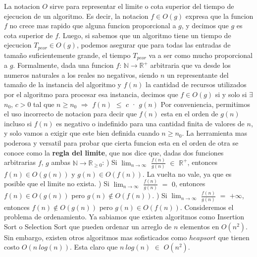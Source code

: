 \documentclass[10pt,a4paper]{article}
\begin{document}
La notacion $O$ sirve para representar el limite o cota superior del tiempo de ejecucion de un algoritmo. Es decir, la notacion $f \in O(g)$ expresa que la funcion $f$ no crece mas rapido que alguna funcion proporcional a $g$, y decimos que $g$ es cota superior de $f$. Luego, si sabemos que un algoritmo tiene un tiempo de ejecucion $T_{peor} \in O(g)$, podemos asegurar que para todas las entradas de tamaño suficientemente grande, el tiempo $T_{peor}$ va a ser como mucho proporcional a $g$. Formalmente, dada una funcion $f$: $\mathbb{N} \to \mathbb{R}^{+}$ arbitraria que va desde los numeros naturales a los reales no negativos, siendo $n$ un representante del tamaño de la instancia del algoritmo y $f(n)$ la cantidad de recursos utilizados por el algoritmo para procesar esa instancia, decimos que $f \in O(g)$ si y solo si $\exists$ $n_{0}$, $c > 0$ tal que $n \geq n_{0}$ $\Rightarrow$ $f(n)$ $\leq$ $c$ · $g(n)$
\newline
\newline
Por conveniencia, permitimos el uso incorrecto de notacion para decir que $f(n)$ esta en el orden de $g(n)$ incluso si $f(n)$ es negativo o indefinido para una cantidad finita de valores de $n$, y solo vamos a exigir que este bien definida cuando $n \geq n_{0}$. La herramienta mas poderosa y versatil para probar que cierta funcion esta en el orden de otra se conoce como la \textbf{regla del limite}, que nos dice que, dadas dos funciones arbitrarias $f$, $g$ ambas $\mathbb{N} \to \mathbb{R}_{\geq 0}$:
\newline
{}) Si $\displaystyle \lim_{n \to \infty}$ $\displaystyle \frac{f(n)}{g(n)}$ $\in$ $\mathbb{R}^{+}$, entonces $f(n) \in O(g(n))$ y $g(n) \in O(f(n))$. La vuelta no vale, ya que es posible que el limite no exista.
\newline
{}) Si $\displaystyle \lim_{n \to \infty}$ $\displaystyle \frac{f(n)}{g(n)}$ $=$ $0$, entonces $f(n) \in O(g(n))$ pero $g(n) \notin O(f(n))$. 
\newline
{}) Si $\displaystyle \lim_{n \to \infty}$ $\displaystyle \frac{f(n)}{g(n)}$ $=$ $+ \infty$, entonces $f(n) \notin O(g(n))$ pero $g(n) \in O(f(n))$. 
\newline
\newline
Consideremos el problema de ordenamiento. Ya sabiamos que existen algoritmos como Insertion
Sort o Selection Sort que pueden ordenar un arreglo de $n$ elementos en $O(n^{2})$. Sin embargo, existen otros algoritmos mas sofisticados como $heapsort$ que tienen costo $O(n ~ log(n))$. Esta claro que $n ~ log(n)$ $\in$ $O(n^{2})$.
\end{document}
